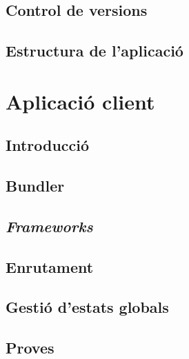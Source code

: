 \documentclass[a4paper,12pt]{ThesisStyle}
\begin{document}
\subsection{Control de versions}
\label{subsec:decisions_estructura_versions}



\subsection{Estructura de l'aplicació}
\label{subsec:decisions_estructura_estructura}



\section{Aplicació client}
\label{sec:decisions_client}

\subsection{Introducció}
\label{subsec:decisions_client_intro}



\subsection{Bundler}
\label{subsec:decisions_client_bundler}


\subsection{\textit{Frameworks}}
\label{subsec:decisions_client_frameworks}


\subsection{Enrutament}
\label{subsec:decisions_client_enrutament}



\subsection{Gestió d'estats globals}
\label{subsec:decisions_client_estats}



\subsection{Proves}
\label{subsec:decisions_client_proves}
\end{document}
